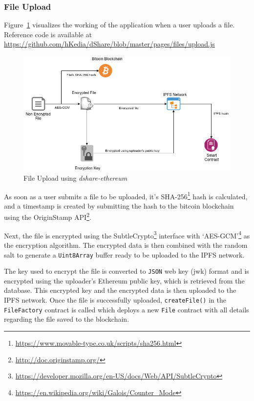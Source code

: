 \subsubsection{File Upload}
Figure~\ref{fig:ethereum-upload} visualizes the working of the application when a user uploads a file. Reference code is available at \url{https://github.com/hKedia/dShare/blob/master/pages/files/upload.js}

\begin{figure}[h]
	\includegraphics[width=\linewidth]{figures/ethereum-upload}
	\caption{\label{fig:ethereum-upload} File Upload using \textit{dshare-ethereum}}
\end{figure}

As soon as a user submits a file to be uploaded, it's SHA-256\footnote{\url{https://www.movable-type.co.uk/scripts/sha256.html}} hash is calculated, and a timestamp is created by submitting the hash to the bitcoin blockchain using the OriginStamp API\footnote{\url{http://doc.originstamp.org/}}.

Next, the file is encrypted using the SubtleCrypto\footnote{\url{https://developer.mozilla.org/en-US/docs/Web/API/SubtleCrypto}} interface with `AES-GCM'\footnote{\url{https://en.wikipedia.org/wiki/Galois/Counter_Mode}} as the encryption algorithm. The encrypted data is then combined with the random salt to generate a \texttt{Uint8Array} buffer ready to be uploaded to the IPFS network.

The key used to encrypt the file is converted to \texttt{JSON} web key (jwk) format and is encrypted using the uploader's Ethereum public key, which is retrieved from the database. This encrypted key and the encrypted data is then uploaded to the IPFS network. Once the file is successfully uploaded, \texttt{createFile()} in the \texttt{FileFactory} contract is called which deploys a new \texttt{File} contract with all details regarding the file saved to the blockchain.

